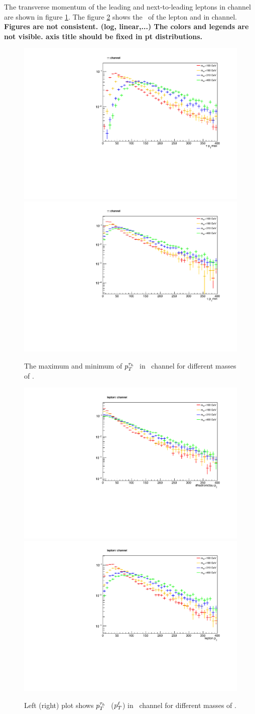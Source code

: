 The transverse momentum of the leading and next-to-leading \Tau leptons in \tauTau channel are shown in figure \ref{fig:pt-hh}. The figure \ref{fig:pt-lh} shows the \pt ~of the lepton and \Tau in \lepTau channel.
{\bf Figures are not consistent. (log, linear,...) The colors and legends are not visible. axis title should be fixed in pt distributions.}
\begin{figure}[!ht]
\centering
\includegraphics*[width=.45\textwidth]{figs/PT-max.pdf}
\hspace{3mm}
\includegraphics*[width=.45\textwidth]{figs/PT-min.pdf}
\caption{The maximum  and minimum of $p_T^{\tau_h~}$ in \tauTau ~channel for different masses of \wprime.}
\label{fig:pt-hh}
\end{figure}
\begin{figure}[!ht]
\centering
\includegraphics*[width=.45\textwidth]{figs/PT-lh.pdf}
\hspace{3mm}
\includegraphics*[width=.45\textwidth]{figs/PT-ll.pdf}
\caption{Left (right) plot shows $p_T^{\tau_h~}$ ($p_T^{\ell}$) in \lepTau ~channel for different masses of \wprime.}
\label{fig:pt-lh}
\end{figure}

  
